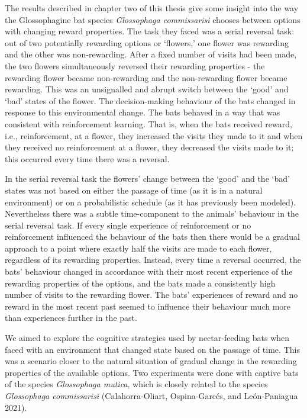 \documentclass[
]{article}
\begin{document}
The results described in chapter two of this thesis give some insight into the way the Glossophagine bat species \emph{Glossophaga commissarisi} chooses between options with changing reward properties. The task they faced was a serial reversal task: out of two potentially rewarding options or `flowers,' one flower was rewarding and the other was non-rewarding. After a fixed number of visits had been made, the two flowers simultaneously reversed their rewarding properties - the rewarding flower became non-rewarding and the non-rewarding flower became rewarding. This was an unsignalled and abrupt switch between the `good' and `bad' states of the flower. The decision-making behaviour of the bats changed in response to this environmental change. The bats behaved in a way that was consistent with reinforcement learning. That is, when the bats received reward, i.e., reinforcement, at a flower, they increased the visits they made to it and when they received no reinforcement at a flower, they decreased the visits made to it; this occurred every time there was a reversal.

In the serial reversal task the flowers' change between the `good' and the `bad' states was not based on either the passage of time (as it is in a natural environment) or on a probabilistic schedule (as it has previously been modeled). Nevertheless there was a subtle time-component to the animals' behaviour in the serial reversal task. If every single experience of reinforcement or no reinforcement influenced the behaviour of the bats then there would be a gradual approach to a point where exactly half the visits are made to each flower, regardless of its rewarding properties. Instead, every time a reversal occurred, the bats' behaviour changed in accordance with their most recent experience of the rewarding properties of the options, and the bats made a consistently high number of visits to the rewarding flower. The bats' experiences of reward and no reward in the most recent past seemed to influence their behaviour much more than experiences further in the past.

We aimed to explore the cognitive strategies used by nectar-feeding bats when faced with an environment that changed state based on the passage of time. This was a scenario closer to the natural situation of gradual change in the rewarding properties of the available options. Two experiments were done with captive bats of the species \emph{Glossophaga mutica}, which is closely related to the species \emph{Glossophaga commissarisi} (Calahorra-Oliart, Ospina-Garcés, and León-Paniagua 2021).
\end{document}
